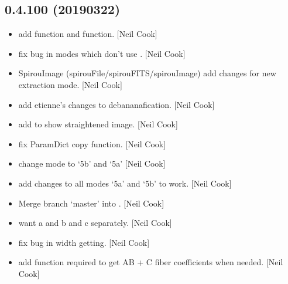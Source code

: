 \documentclass[a4paper,10pt,english]{report}
\begin{document}
\subsection{0.4.100 (2019\sphinxhyphen{}03\sphinxhyphen{}22)}
\label{\detokenize{misc/changelog:id179}}\begin{itemize}
\item {} 
 \sphinxhyphen{} add  function and
 function. {[}Neil Cook{]}

\item {} 
 \sphinxhyphen{} fix bug in modes which don’t use . {[}Neil Cook{]}

\item {} 
SpirouImage (spirouFile/spirouFITS/spirouImage) \sphinxhyphen{} add changes for new
extraction mode. {[}Neil Cook{]}

\item {} 
 \sphinxhyphen{} add etienne’s changes to debananafication. {[}Neil
Cook{]}

\item {} 
 \sphinxhyphen{} add  to show straightened image.
{[}Neil Cook{]}

\item {} 
 \sphinxhyphen{} fix ParamDict copy function. {[}Neil Cook{]}

\item {} 
 \sphinxhyphen{} change mode to ‘5b’ and ‘5a’ {[}Neil Cook{]}

\item {} 
 \sphinxhyphen{} add changes to all modes ‘5a’ and ‘5b’ to
work. {[}Neil Cook{]}

\item {} 
Merge branch ‘master’ into . {[}Neil Cook{]}

\item {} 
 \sphinxhyphen{} want a and b and c separately. {[}Neil Cook{]}

\item {} 
 \sphinxhyphen{} fix bug in width getting. {[}Neil Cook{]}

\item {} 
 \sphinxhyphen{} add function required to get AB + C fiber
coefficients when needed. {[}Neil Cook{]}


\end{itemize}
\end{document}
